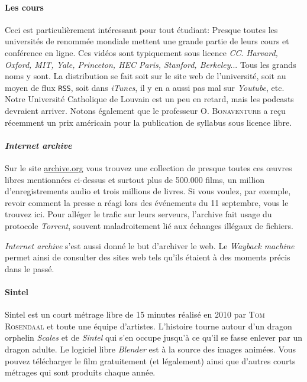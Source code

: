 \paragraph{Les cours}
Ceci est particulièrement intéressant pour tout étudiant: Presque toutes les universités de renommée mondiale mettent une grande partie de leurs cours et conférence en ligne.
Ces vidéos sont typiquement sous licence \textit{CC}. \textit{Harvard, Oxford, MIT, Yale, Princeton, HEC Paris, Stanford, Berkeley}... Tous les grands noms y sont.
La distribution se fait soit sur le site web de l'université, soit au moyen de flux \texttt{RSS}, soit dans \textit{iTunes}, il y en a aussi pas mal sur \textit{Youtube}, etc.
Notre Université Catholique de Louvain est un peu en retard, mais les podcasts devraient arriver.
Notons également que le professeur O. \textsc{Bonaventure} a reçu récemment un prix américain pour la publication de syllabus sous licence libre. %

\paragraph{\textit{Internet archive}}
Sur le site \url{archive.org} vous trouvez une collection de presque toutes ces \oe uvres libres mentionnées ci-dessus et surtout plus de 500.000 films, un million d’enregistrements audio et trois millions de livres.
Si vous voulez, par exemple, revoir comment la presse a réagi lors des événements du 11 septembre, vous le trouvez ici.
Pour alléger le trafic sur leurs serveurs, l'archive fait usage du protocole \textit{Torrent}, souvent maladroitement lié aux échanges illégaux de fichiers.

\textit{Internet archive} s'est aussi donné le but d'archiver le web. Le \textit{Wayback machine} permet ainsi de consulter des sites web tels qu'ils étaient à des moments précis dans le passé.

\paragraph{Sintel}
Sintel est un court métrage libre de 15 minutes réalisé en 2010 par \textsc{Tom Rosendaal} et toute une équipe d'artistes.
L'histoire tourne autour d'un dragon orphelin \textit{Scales} et de \textit{Sintel} qui s'en occupe jusqu'à ce qu'il se fasse enlever par un dragon adulte.
Le logiciel libre \textit{Blender} est à la source des images animées.
Vous pouvez télécharger le film gratuitement (et légalement) ainsi que d'autres courts métrages qui sont produits chaque année.


	
		
	
